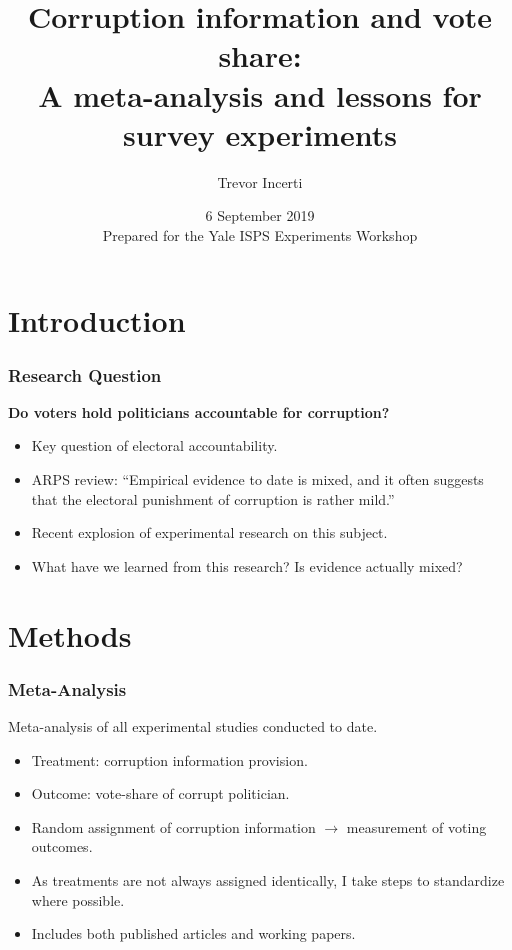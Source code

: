 \documentclass[usenames,dvipsnames]{beamer}
\title{Corruption information and vote share: \\ A meta-analysis and lessons for survey
experiments}
\author{Trevor Incerti}
\date{6 September 2019 \\


\vspace{0.5cm}
\scriptsize
Prepared for the Yale ISPS Experiments Workshop
}
\begin{document}
\maketitle


\section{Introduction}

\begin{frame}
\frametitle{Research Question}
\textbf{Do voters hold politicians accountable for corruption?}
\pause
\begin{itemize}
\item Key question of \textcolor{Cerulean}{electoral accountability}. 
\pause
\item ARPS review: ``Empirical evidence to date is \textcolor{Cerulean}{mixed}, and it often suggests that the electoral punishment of corruption is rather mild.'' \citep{de2017electoral} 
\pause
\item Recent explosion of experimental research on this subject. 
\pause
\item What have we learned from this research? Is evidence actually mixed?
\end{itemize}
\end{frame}


\section{Methods}

\begin{frame}[label = methods]
\frametitle{Meta-Analysis}
Meta-analysis of all \textcolor{Cerulean}{experimental} studies conducted to date. 
\pause
\begin{itemize}
\item \textcolor{Cerulean}{Treatment}: corruption information provision. 
\pause
\item \textcolor{Cerulean}{Outcome}: vote-share of corrupt politician.
\pause
\item Random assignment of corruption information $\rightarrow$ measurement of voting outcomes.
\pause
\item As treatments are not always assigned identically, I take steps to standardize where possible. \hyperlink{details}{}
\pause
\item Includes both \textcolor{Cerulean}{published articles and working papers}.
\end{itemize}
\end{frame}
\end{document}
